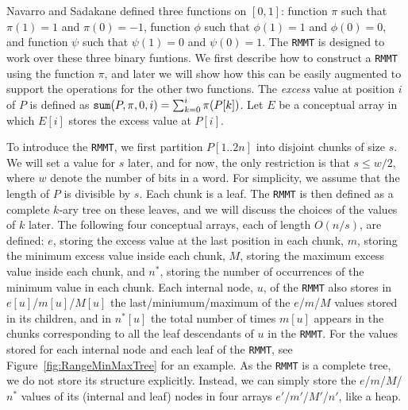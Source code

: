 Navarro and Sadakane defined three functions on $[0,1]$: function $\pi$ such that $\pi(1) = 1$ and $\pi(0) = -1$, function $\phi$ such that $\phi(1) = 1$ and $\phi(0) = 0$, and function $\psi$ such that $\psi(1) = 0$ and $\psi(0) = 1$. The {\tt RMMT} is designed to work over these three binary funtions.
We first describe how to construct a {\tt RMMT} using the function $\pi$, and later we will show how this can be easily augmented to support the operations for the other two functions. 
The {\em excess} value at position $i$ of $P$ is defined as $\mathtt{sum}(P,\pi,0,i) = \sum_{k=0}^{i} \pi(P[k])$. 
Let $E$ be a conceptual array in which $E[i]$ stores the excess value at $P[i]$. 

To introduce the {\tt RMMT}, we first partition $P[1..2n]$ into disjoint chunks of size $s$. We will set a value for $s$ later, and for now, the only restriction is that $s \le w/2$, where $w$ denote the number of bits in a word. For simplicity, we assume that the length of $P$ is divisible by $s$. 
Each chunk is a leaf. The {\tt RMMT} is then defined as a complete $k$-ary tree on these leaves, and we will discuss the choices of the values of $k$ later. %
The following four conceptual arrays, each of length $O(n/s)$, are defined: $e$, storing the excess value at the last position in each chunk, $m$, storing the minimum excess value inside
each chunk, $M$, storing the maximum excess value inside each
chunk, and $n^*$, storing the number of occurrences of the minimum
value in each chunk. 
Each internal node, $u$, of the {\tt RMMT} also stores in $e[u]$/$m[u]$/$M[u]$ the last/miniumum/maximum of the $e$/$m$/$M$ values stored in its children, and in $n^*[u]$ the total number of times $m[u]$ appears in the chunks corresponding to all the leaf descendants of $u$ in the {\tt RMMT}. 
For the values stored for each internal node and each leaf of the {\tt RMMT}, see Figure~\ref{fig:RangeMinMaxTree} for an example. 
As the {\tt RMMT} is a complete tree, we do not store its structure explicitly. 
Instead, we can simply store the $e$/$m$/$M$/$n^*$ values of its (internal and leaf) nodes in four arrays $e'$/$m'$/$M'$/$n'$, like a heap. 


